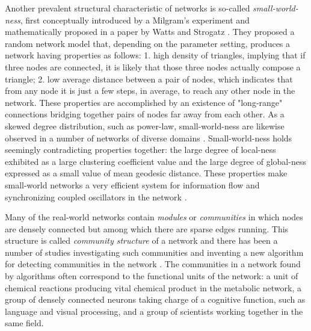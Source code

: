 \documentclass{article}
\begin{document}
	Another prevalent structural characteristic of networks is so-called \textit{small-world-ness}, first conceptually introduced by a Milgram's experiment \cite{Milgram} and mathematically proposed in a paper by Watts and Strogatz \cite{watts1998cds}. They proposed a random network model that, depending on the parameter setting, produces a network having properties as follows: 1. high density of triangles, implying that if three nodes are connected, it is likely that those three nodes actually compose a triangle; 2. low average distance between a pair of nodes, which indicates that from any node it is just a few steps, in average, to reach any other node in the network. These properties are accomplished by an existence of "long-range" connections bridging together pairs of nodes far away from each other. As a skewed degree distribution, such as power-law, small-world-ness are likewise observed in a number of networks of diverse domains \cite{Network_Small-World-Ness}. Small-world-ness holds seemingly contradicting properties together: the large degree of local-ness exhibited as a large clustering coefficient value and the large degree of global-ness expressed as a small value of mean geodesic distance.  These properties make small-world networks a very efficient system for information flow \cite{SmallWorldEfficiency} and synchronizing coupled oscillators in the network \cite{SmallWorldSynchronization}.
	
	Many of the real-world networks contain \textit{modules} or \textit{communities} in which nodes are densely connected but among which there are sparse edges running. This structure is called \textit{community structure} of a network and there has been a number of studies investigating such communities and inventing a new algorithm for detecting communities in the network \cite{Modularity1, Modularity2, ModularityReview}. The communities in a network found by algorithms often correspond to the functional units of the network: a unit of chemical reactions producing vital chemical product in the metabolic network, a group of densely connected neurons taking charge of a cognitive function, such as language and visual processing, and a group of scientists working together in the same field.
	
	
	
\end{document}
